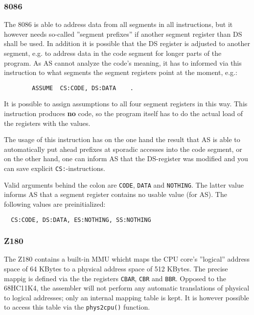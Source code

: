 \documentclass[12pt,twoside]{report}
\newcommand{\bb}[1]{{\bf #1}}
\newcommand{\tty}[1]{{\tt #1}}
\newcommand{\asname}{{AS}}
\begin{document}

\subsubsection{8086}

The 8086 is able to address data from all segments in all
instructions, but it however needs so-called ''segment prefixes'' if
another segment register than DS shall be used.  In addition it is
possible that the DS register is adjusted to another segment, e.g. to
address data in the code segment for longer parts of the program.  As
\asname{} cannot analyze the code's meaning, it has to informed via this
instruction to what segments the segment registers point at the
moment, e.g.:
\begin{verbatim}
        ASSUME  CS:CODE, DS:DATA    .
\end{verbatim}
It is possible to assign assumptions to all four segment registers in
this way.  This instruction produces \bb{no} code, so the program itself
has to do the actual load of the registers with the values.

The usage of this instruction has on the one hand the result that \asname{} is
able to automatically put ahead prefixes at sporadic accesses into the
code segment, or on the other hand, one can inform \asname{} that the DS-register
was modified and you can save explicit \tty{CS:}-instructions.

Valid arguments behind the colon are \tty{CODE}, \tty{DATA} and
\tty{NOTHING}.  The latter value informs \asname{} that a segment register
contains no usable value (for \asname{}).  The following values are
preinitialized:
\begin{verbatim}
  CS:CODE, DS:DATA, ES:NOTHING, SS:NOTHING
\end{verbatim}


\subsubsection{Z180}

The Z180 contains a built-in MMU whicht maps the CPU core's ''logical''
address space of 64 KBytes to a physical address space of 512 KBytes.  The
precise mappig is defined via the the registers {\tt CBAR}, {\tt CBR} and
{\tt BBR}.  Opposed to the 68HC11K4, the assembler will not perform any 
automatic translations of physical to logical addresses; only an internal
mapping table is kept.  It is however possible to access this table via
the {\tt phys2cpu()} function.
\end{document}
